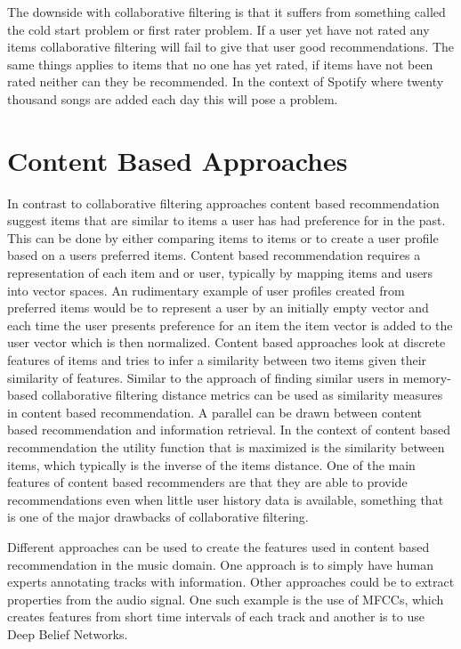 \documentclass[a4paper,11pt]{kth-mag}
\begin{document}
The downside with collaborative filtering is that it suffers from something called the cold start problem or first rater problem. If a user yet have not rated any items collaborative filtering will fail to give that user good recommendations. The same things applies to items that no one has yet rated, if items have not been rated neither can they be recommended\cite{herlocker2004evaluating}\cite{melville2002content}. In the context of Spotify where twenty thousand songs are added each day this will pose a problem.

\section{Content Based Approaches}
In contrast to collaborative filtering approaches content based recommendation suggest items that are similar to items  a user has had preference for in the past. This can be done by either comparing items to items or to create a user profile based on a users preferred items\cite{adomavicius2005toward}. Content based recommendation requires a representation of each item and or user, typically by mapping items and users into vector spaces. An rudimentary example of user profiles created from preferred items would be to represent a user by an initially empty vector and each time the user presents preference for an item the item vector is added to the user vector which is then normalized. Content based approaches look at discrete features of items and tries to infer a similarity between two items given their similarity of features. Similar to the approach of finding similar users in memory-based collaborative filtering distance metrics can be used as similarity measures in content based recommendation. A parallel can be drawn between content based recommendation and information retrieval. In the context of content based recommendation the utility function that is maximized is the similarity between items, which typically is the inverse of the items distance\cite{adomavicius2005toward}. One of the main features of content based recommenders are that they are able to provide recommendations even when little user history data is available, something that is one of the major drawbacks of collaborative filtering\cite{gunawardana2009unified}.

Different approaches can be used to create the features used in content based recommendation in the music domain. One approach is to simply have human experts annotating tracks with information\cite{musicGenome}\cite{tzanetakis2002musical}. Other approaches could be to extract properties from the audio signal. One such example is the use of MFCCs, which creates features from short time intervals of each track\cite{logan2000mel} and another is to use Deep Belief Networks\cite{hamel2010learning}.
\end{document}
